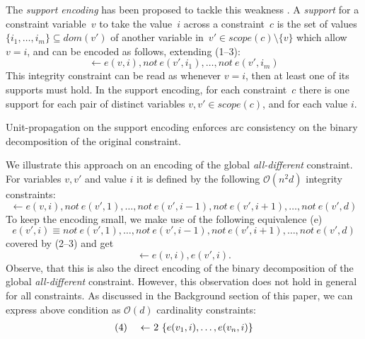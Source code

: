 \documentclass{tlp}
\newcommand{\dneg}{not\ }
\newcommand{\domain}[1]{dom(#1)}
\newcommand{\scope}[1]{scope(#1)}
\begin{document}
The \emph{support encoding} has been proposed to
tackle this weakness \cite{gent02}. A \emph{support} for a constraint variable~$v$ to take the value~$i$ across a constraint~$c$ is the set of values $\{i_1, \dots, i_m\} \subseteq \domain{v'}$ of another variable in~$v' \in \scope{c}\setminus \{v\}$ which allow $v = i$, and can be encoded as follows, extending (1--3):
\[
\leftarrow e(v, i), \dneg e(v', i_1), \dots, \dneg e(v', i_m)
\]
This integrity constraint can be read as whenever $v = i$, then at least one of its supports must hold.
In the support encoding, for each constraint~$c$ there is one support for each pair of distinct variables $v, v' \in \scope{c}$, and for each value $i$.
\begin{theorem} \label{thm:arc}
Unit-propagation on the support encoding enforces arc consistency on the binary decomposition of the original constraint.
\end{theorem}
We illustrate this approach on an encoding of the global \emph{all-different} constraint. For variables $v, v'$ and value $i$ it is defined by the following $\mathcal{O}(n^2d)$ integrity constraints:
\[
\leftarrow e(v, i), \dneg e(v', 1), \dots, \dneg e(v', {i-1}), \dneg e(v', {i+1}), \dots, \dneg e(v', d)
\]
To keep the encoding small, we make use of the following equivalence (e)
\[
e(v', i) \equiv \dneg e(v', 1), \dots, \dneg e(v', {i-1}), \dneg e(v', {i+1}), \dots, \dneg e(v', d)
\]
covered by (2--3) and get
\[
\leftarrow e(v, i), e(v', i).
\]
Observe, that this is also
the direct encoding of the binary decomposition of the global \emph{all-different} constraint. However, this observation does not hold in general for all constraints.
As discussed in the Background section of this paper, we can express above condition as $\mathcal{O}(d)$ cardinality constraints:
\[
\begin{array}{lr@{\ \leftarrow\ }l}
(4) & & 2\ \{ e(v_1, i), \dots, e(v_n, i) \}
\end{array}
\]
\end{document}
